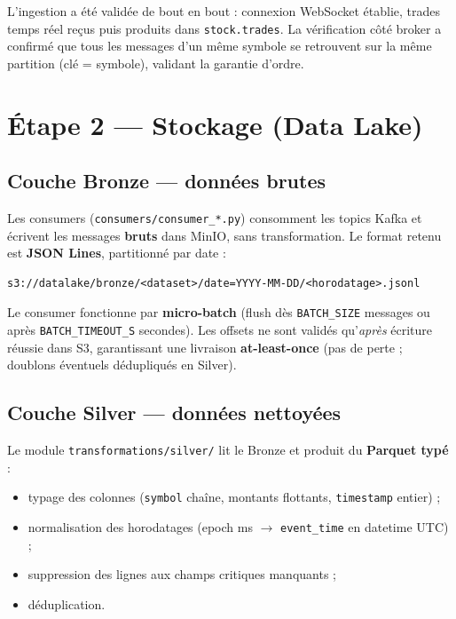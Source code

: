 \documentclass[11pt,a4paper]{article}
\newcommand{\code}[1]{\texttt{\small #1}}
\begin{document}
L'ingestion a été validée de bout en bout : connexion WebSocket établie,
trades temps réel reçus puis produits dans \code{stock.trades}. La vérification
côté broker a confirmé que tous les messages d'un même symbole se retrouvent sur
la même partition (clé = symbole), validant la garantie d'ordre.

\section{Étape 2 — Stockage (Data Lake)}

\subsection{Couche Bronze — données brutes}

Les consumers (\code{consumers/consumer\_*.py}) consomment les topics Kafka et
écrivent les messages \textbf{bruts} dans MinIO, sans transformation. Le format
retenu est \textbf{JSON Lines}, partitionné par date :

\begin{lstlisting}
s3://datalake/bronze/<dataset>/date=YYYY-MM-DD/<horodatage>.jsonl
\end{lstlisting}

Le consumer fonctionne par \textbf{micro-batch} (flush dès \code{BATCH\_SIZE}
messages ou après \code{BATCH\_TIMEOUT\_S} secondes). Les offsets ne sont
validés qu'\emph{après} écriture réussie dans S3, garantissant une livraison
\textbf{at-least-once} (pas de perte ; doublons éventuels dédupliqués en Silver).

\subsection{Couche Silver — données nettoyées}

Le module \code{transformations/silver/} lit le Bronze et produit du
\textbf{Parquet typé} :
\begin{itemize}
  \item typage des colonnes (\code{symbol} chaîne, montants flottants,
        \code{timestamp} entier) ;
  \item normalisation des horodatages (epoch ms $\rightarrow$ \code{event\_time}
        en datetime UTC) ;
  \item suppression des lignes aux champs critiques manquants ;
  \item déduplication.
\end{itemize}
\end{document}
